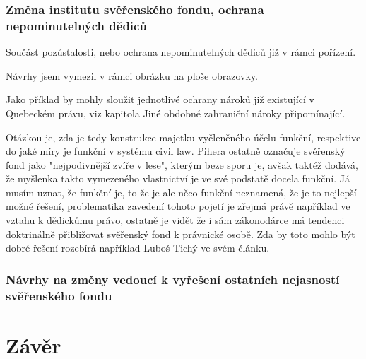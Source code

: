 \documentclass{article}
\begin{document}


\subsubsection{Změna institutu svěřenského fondu, ochrana nepominutelných dědiců}

Součást pozůstalosti, nebo ochrana nepominutelných dědiců již v rámci pořízení.

Návrhy jsem vymezil v rámci obrázku na ploše obrazovky.


Jako příklad by mohly sloužit jednotlivé ochrany nároků již existující v Quebeckém právu, viz kapitola Jiné obdobné zahraniční nároky připomínající.

Otázkou je, zda je tedy konstrukce majetku vyčleněného účelu funkční, respektive do jaké míry je funkční v systému civil law. Pihera ostatně označuje svěřenský fond jako "nejpodivnější zvíře v lese", kterým beze sporu je, avšak taktéž dodává, že myšlenka takto vymezeného vlastnictví je ve své podstatě docela funkční. Já musím uznat, že funkční je, to že je ale něco funkční neznamená, že je to nejlepší možné řešení, problematika zavedení tohoto pojetí je zřejmá právě například ve vztahu k dědickůmu právo, ostatně je vidět že i sám zákonodárce má tendenci doktrinálně přibližovat svěřenský fond k právnické osobě. Zda by toto mohlo být dobré řešení rozebírá například Luboš Tichý ve svém článku.\\

\subsubsection{Návrhy na změny vedoucí k vyřešení ostatních nejasností svěřenského fondu}

\newpage

\section{Závěr}
\end{document}
